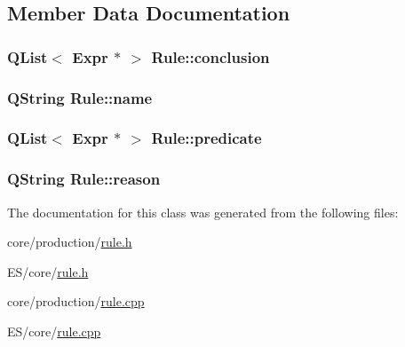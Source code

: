 \subsection{Member Data Documentation}
\hypertarget{class_rule_a4b9f24353c786012ea35a3084b532bf4}{
\subsubsection[{conclusion}]{\setlength{\rightskip}{0pt plus 5cm}QList$<$ {\bf Expr} $\ast$ $>$ {\bf Rule::conclusion}}}
\label{class_rule_a4b9f24353c786012ea35a3084b532bf4}
\hypertarget{class_rule_af5e25a3d83f8963196a15e4809900272}{
\subsubsection[{name}]{\setlength{\rightskip}{0pt plus 5cm}QString {\bf Rule::name}}}
\label{class_rule_af5e25a3d83f8963196a15e4809900272}
\hypertarget{class_rule_ab55a8077095ffcc02e641a391d0b8654}{
\subsubsection[{predicate}]{\setlength{\rightskip}{0pt plus 5cm}QList$<$ {\bf Expr} $\ast$ $>$ {\bf Rule::predicate}}}
\label{class_rule_ab55a8077095ffcc02e641a391d0b8654}
\hypertarget{class_rule_a58f0a170115a8423414eb67c8b3f541d}{
\subsubsection[{reason}]{\setlength{\rightskip}{0pt plus 5cm}QString {\bf Rule::reason}}}
\label{class_rule_a58f0a170115a8423414eb67c8b3f541d}


The documentation for this class was generated from the following files:\begin{DoxyCompactItemize}
\item 
core/production/\hyperlink{core_2production_2rule_8h}{rule.h}\item 
ES/core/\hyperlink{_e_s_2core_2rule_8h}{rule.h}\item 
core/production/\hyperlink{core_2production_2rule_8cpp}{rule.cpp}\item 
ES/core/\hyperlink{_e_s_2core_2rule_8cpp}{rule.cpp}\end{DoxyCompactItemize}
